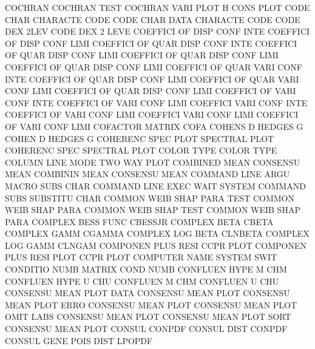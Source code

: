 COCHRAN                                 COCHRAN  TEST
COCHRAN  VARI PLOT                      H        CONS PLOT
CODE     CHAR                           CHARACTE CODE
CODE     CHAR DATA                      CHARACTE CODE
CODE     DEX  2LEV                      CODE     DEX  2    LEVE
COEFFICI OF   DISP CONF INTE            COEFFICI OF   DISP CONF LIMI
COEFFICI OF   QUAR DISP CONF INTE       COEFFICI OF   QUAR DISP CONF LIMI
COEFFICI OF   QUAR DISP CONF LIMI       COEFFICI OF   QUAR DISP CONF LIMI
COEFFICI OF   QUAR VARI CONF INTE       COEFFICI OF   QUAR DISP CONF LIMI
COEFFICI OF   QUAR VARI CONF LIMI       COEFFICI OF   QUAR DISP CONF LIMI
COEFFICI OF   VARI CONF INTE            COEFFICI OF   VARI CONF LIMI
COEFFICI VARI CONF INTE                 COEFFICI OF   VARI CONF LIMI
COEFFICI VARI CONF LIMI                 COEFFICI OF   VARI CONF LIMI
COFACTOR                                MATRIX   COFA
COHENS   D                              HEDGES   G
COHEN    D                              HEDGES   G
COHERENC SPEC PLOT                      SPECTRAL PLOT
COHERENC SPEC                           SPECTRAL PLOT
COLOR    TYPE                           COLOR    TYPE
COLUMN   LINE MODE                      TWO      WAY  PLOT
COMBINED MEAN                           CONSENSU MEAN
COMBININ MEAN                           CONSENSU MEAN
COMMAND  LINE ARGU                      MACRO    SUBS CHAR
COMMAND  LINE EXEC WAIT                 SYSTEM
COMMAND  SUBS                           SUBSTITU CHAR
COMMON   WEIB SHAP PARA TEST            COMMON   WEIB SHAP PARA
COMMON   WEIB SHAP TEST                 COMMON   WEIB SHAP PARA
COMPLEX  BESS FUNC                      CBESSJR
COMPLEX  BETA                           CBETA
COMPLEX  GAMM                           CGAMMA
COMPLEX  LOG BETA                       CLNBETA
COMPLEX  LOG GAMM                       CLNGAM
COMPONEN PLUS RESI                      CCPR     PLOT
COMPONEN PLUS RESI PLOT                 CCPR     PLOT
COMPUTER NAME                           SYSTEM   SWIT
CONDITIO NUMB                           MATRIX   COND NUMB
CONFLUEN HYPE M                         CHM
CONFLUEN HYPE U                         CHU
CONFLUEN M                              CHM
CONFLUEN U                              CHU
CONSENSU MEAN PLOT DATA                 CONSENSU MEAN PLOT
CONSENSU MEAN PLOT ERRO                 CONSENSU MEAN PLOT
CONSENSU MEAN PLOT OMIT LABS            CONSENSU MEAN PLOT
CONSENSU MEAN PLOT SORT                 CONSENSU MEAN PLOT
CONSUL                                  CONPDF
CONSUL   DIST                           CONPDF
CONSUL   GENE POIS DIST                 LPOPDF
